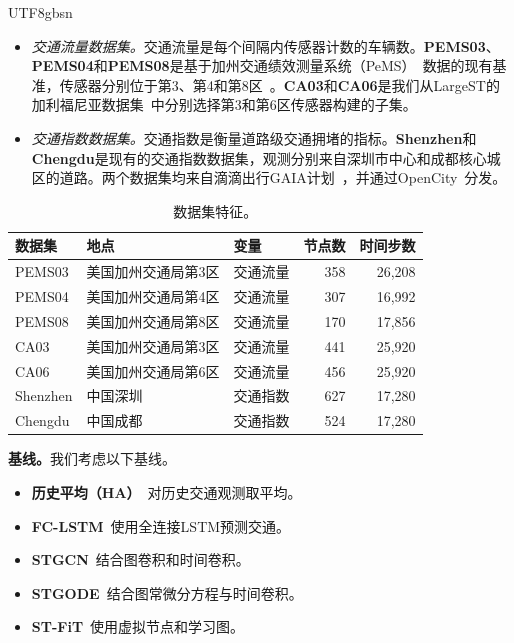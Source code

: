 \documentclass[runningheads,a4paper]{llncs}
\begin{document}
\begin{CJK*}{UTF8}{gbsn}
\DeclareRobustCommand{\datasetvariablelist}{%
  \begin{itemize}
  \item \emph{交通流量数据集。}交通流量是每个间隔内传感器计数的车辆数。\textbf{PEMS03}、\textbf{PEMS04}和\textbf{PEMS08}是基于加州交通绩效测量系统（PeMS）~\cite{pems}数据的现有基准，传感器分别位于第3、第4和第8区~\cite{stfit}。\textbf{CA03}和\textbf{CA06}是我们从LargeST的加利福尼亚数据集~\cite{largest}中分别选择第3和第6区传感器构建的子集。
  \item \emph{交通指数数据集。}交通指数是衡量道路级交通拥堵的指标。\textbf{Shenzhen}和\textbf{Chengdu}是现有的交通指数数据集，观测分别来自深圳市中心和成都核心城区的道路。两个数据集均来自滴滴出行GAIA计划~\cite{stgfsl}，并通过OpenCity~\cite{opencity}分发。
  \end{itemize}%
}
\datasetvariablelist

\begin{table}[!ht]
\centering
\DeclareRobustCommand{\datasetstatisticstable}{%
\caption{数据集特征。}
\label{tab:datasets}
\footnotesize
\setlength{\tabcolsep}{1pt}
\renewcommand{\arraystretch}{1.1}
\begin{tabular*}{\linewidth}{@{\extracolsep{\fill}}lllrr@{}}
\hline
数据集 & 地点 & 变量 & 节点数 & 时间步数 \\
\hline
PEMS03 & 美国加州交通局第3区 & 交通流量 & 358 & 26,208 \\
PEMS04 & 美国加州交通局第4区 & 交通流量 & 307 & 16,992 \\
PEMS08 & 美国加州交通局第8区 & 交通流量 & 170 & 17,856 \\
CA03 & 美国加州交通局第3区 & 交通流量 & 441 & 25,920 \\
CA06 & 美国加州交通局第6区 & 交通流量 & 456 & 25,920 \\
Shenzhen & 中国深圳 & 交通指数 & 627 & 17,280 \\
Chengdu & 中国成都 & 交通指数 & 524 & 17,280 \\
\hline
\end{tabular*}%
}
\datasetstatisticstable
\end{table}

\begingroup
\DeclareRobustCommand{\baselinecomparison}{%
  \noindent\textbf{基线。}我们考虑以下基线。
  \begin{itemize}
  \item \textbf{历史平均（HA）}~\cite{dai2020hstgcn}对历史交通观测取平均。
  \item \textbf{FC-LSTM}~\cite{sutskever2014seq2seq}使用全连接LSTM预测交通。
  \item \textbf{STGCN}~\cite{stgcn}结合图卷积和时间卷积。
  \item \textbf{STGODE}~\cite{fang2021stgode}结合图常微分方程与时间卷积。
  \item \textbf{ST-FiT}~\cite{stfit}使用虚拟节点和学习图。
  \end{itemize}%
}
\begin{samepage}
\baselinecomparison
\end{samepage}
\endgroup


\end{CJK*}
\end{document}
